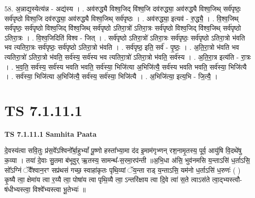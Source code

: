 \documentclass[17pt]{extarticle}
\begin{document}
58. अ॒न्नाद्य॒स्येत्य॑न्न - अद्य॑स्य । . अव॑रुद्ध्यै विश्व॒जिद् वि॑श्व॒जि दव॑रुद्ध्या॒ अव॑रुद्ध्यै विश्व॒जिथ् सर्व॑पृष्ठः॒ सर्व॑पृष्ठो विश्व॒जि दव॑रुद्ध्या॒ अव॑रुद्ध्यै विश्व॒जिथ् सर्व॑पृष्ठः । . अव॑रुद्ध्या॒ इत्यव॑ - रु॒द्ध्यै॒ । . वि॒श्व॒जिथ् सर्व॑पृष्ठः॒ सर्व॑पृष्ठो विश्व॒जिद् वि॑श्व॒जिथ् सर्व॑पृष्ठो ऽतिरा॒त्रो॑ ऽतिरा॒त्रः सर्व॑पृष्ठो विश्व॒जिद् वि॑श्व॒जिथ् सर्व॑पृष्ठो ऽतिरा॒त्रः । . वि॒श्व॒जिदिति॑ विश्व - जित् । . सर्व॑पृष्ठो ऽतिरा॒त्रो॑ ऽतिरा॒त्रः सर्व॑पृष्ठः॒ सर्व॑पृष्ठो ऽतिरा॒त्रो भ॑वति भव त्यतिरा॒त्रः सर्व॑पृष्ठः॒ सर्व॑पृष्ठो ऽतिरा॒त्रो भ॑वति । . सर्व॑पृष्ठ॒ इति॒ सर्व॑ - पृ॒ष्ठः॒ । . अ॒ति॒रा॒त्रो भ॑वति भव त्यतिरा॒त्रो॑ ऽतिरा॒त्रो भ॑वति॒ सर्व॑स्य॒ सर्व॑स्य भव त्यतिरा॒त्रो॑ ऽतिरा॒त्रो भ॑वति॒ सर्व॑स्य । . अ॒ति॒रा॒त्र इत्य॑ति - रा॒त्रः । . भ॒व॒ति॒ सर्व॑स्य॒ सर्व॑स्य भवति भवति॒ सर्व॑स्या॒ भिजि॑त्या अ॒भिजि॑त्यै॒ सर्व॑स्य भवति भवति॒ सर्व॑स्या॒ भिजि॑त्यै । . सर्व॑स्या॒ भिजि॑त्या अ॒भिजि॑त्यै॒ सर्व॑स्य॒ सर्व॑स्या॒ भिजि॑त्यै । . अ॒भिजि॑त्या॒ इत्य॒भि - जि॒त्यै॒ । \newline
\pagebreak
{}

\section{ TS 7.1.11.1 }

\textbf{TS 7.1.11.1 } \newline
\textbf{Samhita Paata} \newline

दे॒वस्य॑त्वा सवि॒तुः प्र॑स॒वे᳚ऽश्विनो᳚र्बा॒हुभ्यां᳚ पू॒ष्णो हस्ता᳚भ्या॒मा द॑द इ॒माम॑गृभ्णन् रश॒नामृ॒तस्य॒ पूर्व॒ आयु॑षि वि॒दथे॑षु क॒व्या । तया॑ दे॒वाः सु॒तमा ब॑भूवुर् ऋ॒तस्य॒ सामन्थ᳚-स॒रमा॒रप॑न्ती ॥अ॒भि॒धा अ॑सि॒ भुव॑नमसि य॒न्ताऽसि॑ ध॒र्ताऽसि॒ सो᳚ऽग्निं ॅवै᳚श्वान॒रꣳ सप्र॑थसं गच्छ॒ स्वाहा॑कृतः पृथि॒व्यां ॅय॒न्ता राड् य॒न्ताऽसि॒ यम॑नो ध॒र्ताऽसि॑ ध॒रुणः॑ ( ) कृ॒ष्यै त्वा॒ क्षेमा॑य त्वा र॒य्यै त्वा॒ पोषा॑य त्वा पृथि॒व्यै त्वा॒ ऽन्तरि॑क्षाय त्वा दि॒वे त्वा॑ स॒ते त्वाऽस॑ते त्वा॒द्भ्यस्त्वौ-ष॑धीभ्यस्त्वा॒ विश्वे᳚भ्यस्त्वा भू॒तेभ्यः॑ ॥ \newline
\end{document}
